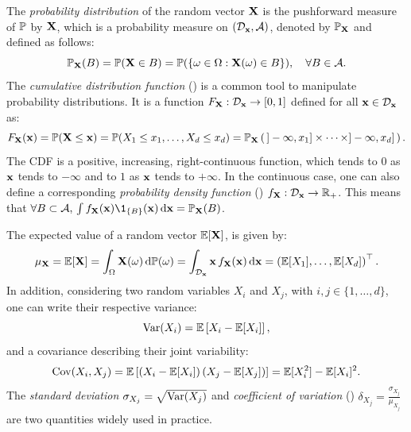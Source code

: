 The \textit{probability distribution} of the random vector $\bX$ is the pushforward measure of $\P$ by $\bX$, which is a probability measure on $(\iD_{\bx}, \iA)$, denoted by $\P_{\bX}$ and defined as follows: 
\begin{equation}
    \P_{\bX}(B) = \P(\bX \in B) = \P(\{\omega \in \Omega : \bX(\omega)\in B\}), \quad \forall B \in \iA.
\end{equation}
The \textit{cumulative distribution function} () is a common tool to manipulate probability distributions. 
It is a function $F_{\bX} : \iD_{\bx} \rightarrow [0, 1]$ defined for all $\bx \in \iD_{\bx}$ as: 
\begin{equation}
    F_{\bX}(\bx) = \P(\bX \leq \bx)
            = \P(X_1 \leq x_1, \dots, X_d \leq x_d)
            = \P_{\bX}\left(\, ]-\infty, x_1] \times \dots \times ]-\infty, x_d]\, \right).
\end{equation}
The CDF is a positive, increasing, right-continuous function, which tends to $0$ as $\bx$ tends to $-\infty$ and to $1$ as $\bx$ tends to $+\infty$. 
In the continuous case, one can also define a corresponding \textit{probability density function} () $f_{\bX}: \iD_{\bx} \rightarrow \R_+$. 
This means that $\forall B \subset \iA, \, \int f_\bX(\bx) \1_{\{B\}}(\bx) \, \dd \bx = \P_\bX(B)$.   

The expected value of a random vector $\E[\bX]$, is given by:
\begin{equation}
    \mu_{\bX} = \E[\bX] = \int_{\Omega} \bX(\omega) \,\dd \P(\omega) =  \int_{\iD_{\bx}} \bx \, f_{\bX}(\bx) \, \dd\bx = \left(\E[X_1], \dots, \E[X_d]\right)\TT.
\end{equation}
In addition, considering two random variables $X_i$ and $X_j$, with $i, j \in \{1, \dots, d\}$, one can write their respective variance:
\begin{equation}
    \var(X_i) = \E\left[X_i - \E[X_i]\right],
\end{equation}
and a covariance describing their joint variability:
\begin{equation}
    \cov(X_i, X_j) = \E\left[\left(X_i - \E[X_i]\right) \left(X_j - \E[X_j]\right)\right] = \E[X_i^2] - \E[X_i]^2 .
\end{equation}
The \textit{standard deviation} $\sigma_{X_j} = \sqrt{\var(X_j)}$ and \textit{coefficient of variation} () $\delta_{X_j} = \frac{\sigma_{X_j}}{\mu_{X_j}}$ are two quantities widely used in practice.

